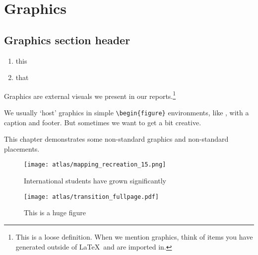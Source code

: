 

\chapter{Graphics}

\section{Graphics section header}

\begin{enumerate}
\item this 
\item that
\end{enumerate}

Graphics are external visuals we present in our reports.\footnote{This is a loose definition. When we mention graphics, think of items you have generated outside of \LaTeX\ and are imported in.}

We usually `host' graphics in simple \texttt{\textbackslash begin\{figure\}} environments, like , with a caption and footer. But sometimes we want to get a bit creative. 

This chapter demonstrates some non-standard graphics and non-standard placements.


    \begin{figure}
    \caption{International students have grown significantly}
    \vspace{-7.5mm} %
    \texttt{[image: atlas/mapping\_recreation\_15.png]}
        \label{fig:firsteg} 
    \end{figure}
    
    
    
    
    \begin{figure*}
    \caption{This is a huge figure}
        \texttt{[image: atlas/transition\_fullpage.pdf]}
        \label{fig:fullpage} 
    \end{figure*}
    
    